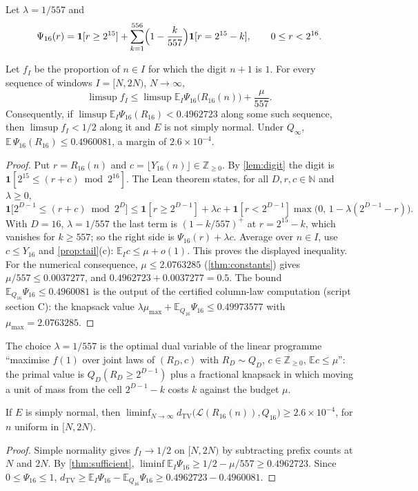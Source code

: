 \documentclass[11pt]{article}
\newcommand{\Ex}{\mathbb E}
\newcommand{\Av}{\mathbb E}
\newcommand{\dTV}{d_{\mathrm{TV}}}
\newcommand{\ind}{\mathbf 1}
\newcommand{\Qinf}{{Q_\infty}}
\begin{document}
Let $\lambda=1/557$ and
\[
\Psi_{16}(r)=\ind[r\ge2^{15}]+\sum_{k=1}^{556}\Bigl(1-\frac k{557}\Bigr)\ind[r=2^{15}-k],\qquad 0\le r<2^{16}.
\]

\begin{theorem}\label{thm:sufficient}
Let $f_I$ be the proportion of $n\in I$ for which the digit $n{+}1$ is $1$. For every sequence of windows $I=[N,2N)$, $N\to\infty$,
\[
\limsup f_I\le\limsup\Av_I\Psi_{16}\bigl(R_{16}(n)\bigr)+\frac{\mu}{557}.
\]
Consequently, if $\limsup\Av_I\Psi_{16}(R_{16})<0.4962723$ along some such sequence, then $\limsup f_I<1/2$ along it and $E$ is not simply normal. Under $\Qinf$, $\Ex\,\Psi_{16}(R_{16})\le0.4960081$, a margin of $2.6\times10^{-4}$.
\end{theorem}

\begin{proof}
Put $r=R_{16}(n)$ and $c=\lfloor Y_{16}(n)\rfloor\in\mathbb Z_{\ge0}$. By \cref{lem:digit} the digit is $\ind[2^{15}\le(r+c)\bmod2^{16}]$. The Lean theorem  states, for all $D,r,c\in\mathbb N$ and $\lambda\ge0$,
\[
\ind\bigl[2^{D-1}\le(r+c)\bmod2^D\bigr]\le\ind[r\ge2^{D-1}]+\lambda c+\ind[r<2^{D-1}]\max\bigl(0,\,1-\lambda(2^{D-1}-r)\bigr).
\]
With $D=16$, $\lambda=1/557$ the last term is $(1-k/557)^+$ at $r=2^{15}-k$, which vanishes for $k\ge557$; so the right side is $\Psi_{16}(r)+\lambda c$. Average over $n\in I$, use $c\le Y_{16}$ and \cref{prop:tail}(c): $\Av_Ic\le\mu+o(1)$. This proves the displayed inequality. For the numerical consequence, $\mu\le2.0763285$ (\cref{thm:constants}) gives $\mu/557\le0.0037277$, and $0.4962723+0.0037277=0.5$. The bound $\Ex_{Q_{16}}\Psi_{16}\le0.4960081$ is the output of the certified column-law computation (script section C): the knapsack value $\lambda\mu_{\max}+\Ex_{Q_{16}}\Psi_{16}\le0.49973577$ with $\mu_{\max}=2.0763285$.
\end{proof}

The choice $\lambda=1/557$ is the optimal dual variable of the linear programme ``maximise $f(1)$ over joint laws of $(R_D,c)$ with $R_D\sim Q_D$, $c\in\mathbb Z_{\ge0}$, $\Ex c\le\mu$'': the primal value is $Q_D(R_D\ge2^{D-1})$ plus a fractional knapsack in which moving a unit of mass from the cell $2^{D-1}-k$ costs $k$ against the budget $\mu$.

\begin{corollary}\label{cor:tv}
If $E$ is simply normal, then $\liminf_{N\to\infty}\dTV\bigl(\mathcal L(R_{16}(n)),Q_{16}\bigr)\ge2.6\times10^{-4}$, for $n$ uniform in $[N,2N)$.
\end{corollary}
\begin{proof}
Simple normality gives $f_I\to1/2$ on $[N,2N)$ by subtracting prefix counts at $N$ and $2N$. By \cref{thm:sufficient}, $\liminf\Av_I\Psi_{16}\ge1/2-\mu/557\ge0.4962723$. Since $0\le\Psi_{16}\le1$, $\dTV\ge\Av_I\Psi_{16}-\Ex_{Q_{16}}\Psi_{16}\ge0.4962723-0.4960081$.
\end{proof}
\end{document}
